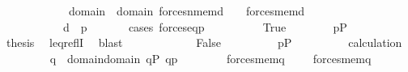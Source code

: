 \begin{isabellebody}
\ \ \ \ \ \ \ \ \ \ \ \ {\isacharparenleft}{\kern0pt}{\isasymexists}{\isasymsigma}{\isasymin}domain{\isacharparenleft}{\kern0pt}{\isasymtau}{\isacharparenright}{\kern0pt}\ {\isasymunion}\ domain{\isacharparenleft}{\kern0pt}{\isasymtheta}{\isacharparenright}{\kern0pt}{\isachardot}{\kern0pt}\ forces{\isacharunderscore}{\kern0pt}nmem{\isacharparenleft}{\kern0pt}d{\isacharcomma}{\kern0pt}\ {\isasymsigma}{\isacharcomma}{\kern0pt}\ {\isasymtau}{\isacharparenright}{\kern0pt}\ {\isasymand}\ forces{\isacharunderscore}{\kern0pt}mem{\isacharparenleft}{\kern0pt}d{\isacharcomma}{\kern0pt}\ {\isasymsigma}{\isacharcomma}{\kern0pt}\ {\isasymtheta}{\isacharparenright}{\kern0pt}{\isacharparenright}{\kern0pt}{\isacharparenright}{\kern0pt}\ {\isasymand}\isanewline
\ \ \ \ \ \ \ \ \ \ \ d\ {\isasympreceq}\ p{\isachardoublequoteclose}\ \isanewline
\ \ \ \ \isamarkupfalse%
\ {\isacharparenleft}{\kern0pt}cases\ {\isachardoublequoteopen}forces{\isacharunderscore}{\kern0pt}eq{\isacharparenleft}{\kern0pt}p{\isacharcomma}{\kern0pt}\ {\isasymtau}{\isacharcomma}{\kern0pt}\ {\isasymtheta}{\isacharparenright}{\kern0pt}{\isachardoublequoteclose}{\isacharparenright}{\kern0pt}\isanewline
\ \ \ \ \ \ \isamarkupfalse%
\ True\isanewline
\ \ \ \ \ \ \isamarkupfalse%
\ {\isacartoucheopen}p{\isasymin}P{\isacartoucheclose}\ \isanewline
\ \ \ \ \ \ \isamarkupfalse%
\ {\isacharquery}{\kern0pt}thesis\ \isamarkupfalse%
\ leq{\isacharunderscore}{\kern0pt}reflI\ \isamarkupfalse%
\ blast\isanewline
\ \ \ \ \isamarkupfalse%
\isanewline
\ \ \ \ \ \ \isamarkupfalse%
\ False\isanewline
\ \ \ \ \ \ \isamarkupfalse%
\ \isamarkupfalse%
\ {\isacartoucheopen}p{\isasymin}P{\isacartoucheclose}\isanewline
\ \ \ \ \ \ \isamarkupfalse%
\ \isamarkupfalse%
\ calculation\isanewline
\ \ \ \ \ \ \isamarkupfalse%
\ {\isasymsigma}\ q\ \ {\isachardoublequoteopen}{\isasymsigma}{\isasymin}domain{\isacharparenleft}{\kern0pt}{\isasymtau}{\isacharparenright}{\kern0pt}{\isasymunion}domain{\isacharparenleft}{\kern0pt}{\isasymtheta}{\isacharparenright}{\kern0pt}{\isachardoublequoteclose}\ {\isachardoublequoteopen}q{\isasymin}P{\isachardoublequoteclose}\ {\isachardoublequoteopen}q{\isasympreceq}p{\isachardoublequoteclose}\isanewline
\ \ \ \ \ \ \ \ {\isachardoublequoteopen}{\isacharparenleft}{\kern0pt}forces{\isacharunderscore}{\kern0pt}mem{\isacharparenleft}{\kern0pt}q{\isacharcomma}{\kern0pt}\ {\isasymsigma}{\isacharcomma}{\kern0pt}\ {\isasymtau}{\isacharparenright}{\kern0pt}\ {\isasymand}\ {\isasymnot}\ forces{\isacharunderscore}{\kern0pt}mem{\isacharparenleft}{\kern0pt}q{\isacharcomma}{\kern0pt}\ {\isasymsigma}{\isacharcomma}{\kern0pt}\ {\isasymtheta}{\isacharparenright}{\kern0pt}{\isacharparenright}{\kern0pt}\ {\isasymor}\isanewline

\end{isabellebody}
